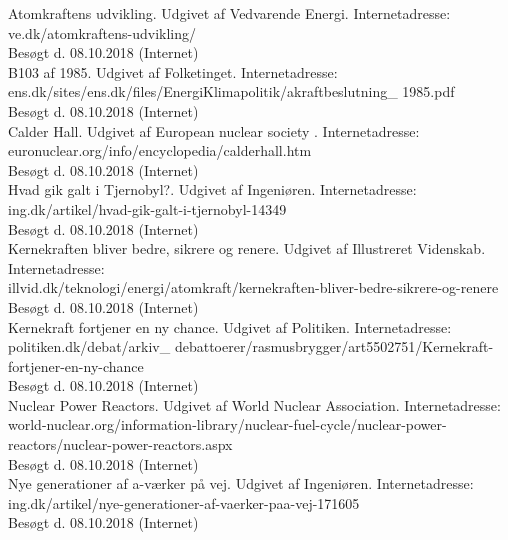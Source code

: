 \documentclass{article}
\begin{document}
Atomkraftens udvikling. Udgivet af Vedvarende Energi. Internetadresse:\\
ve.dk/atomkraftens-udvikling/\\
Besøgt d. 08.10.2018 (Internet)\\

B103 af 1985. Udgivet af Folketinget. Internetadresse:\\
ens.dk/sites/ens.dk/files/EnergiKlimapolitik/akraftbeslutning\_ 1985.pdf\\
Besøgt d. 08.10.2018 (Internet)\\

Calder Hall. Udgivet af European nuclear society . Internetadresse:\\
euronuclear.org/info/encyclopedia/calderhall.htm\\
Besøgt d. 08.10.2018 (Internet)\\

Hvad gik galt i Tjernobyl?. Udgivet af Ingeniøren. Internetadresse:\\
ing.dk/artikel/hvad-gik-galt-i-tjernobyl-14349\\
Besøgt d. 08.10.2018 (Internet)\\

Kernekraften bliver bedre, sikrere og renere. Udgivet af Illustreret Videnskab. Internetadresse:\\
illvid.dk/teknologi/energi/atomkraft/kernekraften-bliver-bedre-sikrere-og-renere\\
Besøgt d. 08.10.2018 (Internet)\\

Kernekraft fortjener en ny chance. Udgivet af Politiken. Internetadresse:\\
politiken.dk/debat/arkiv\_ debattoerer/rasmusbrygger/art5502751/Kernekraft-fortjener-en-ny-chance\\
Besøgt d. 08.10.2018 (Internet)\\

Nuclear Power Reactors. Udgivet af World Nuclear Association. Internetadresse:\\
world-nuclear.org/information-library/nuclear-fuel-cycle/nuclear-power-reactors/nuclear-power-reactors.aspx\\
Besøgt d. 08.10.2018 (Internet)\\

Nye generationer af a-værker på vej. Udgivet af Ingeniøren. Internetadresse:\\
ing.dk/artikel/nye-generationer-af-vaerker-paa-vej-171605\\
Besøgt d. 08.10.2018 (Internet)\\
\end{document}
